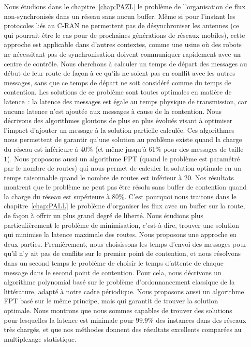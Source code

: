 Nous étudions dans le chapitre~\ref{chap:PAZL} le problème de l'organisation de flux non-synchronisés dans un réseau sans aucun buffer.
Même si pour l'instant les protocoles liés au C-RAN ne permettent pas de désynchroniser les antennes (ce qui pourrait être le cas pour de prochaines générations de réseaux mobiles), cette approche est applicable dans d'autres contextes, comme une usine où des robots ne nécessitant pas de synchronisation doivent communiquer rapidement avec un centre de contrôle.
Nous cherchons à calculer un temps de départ des messages au début de leur route de façon à ce qu'ils ne soient pas en conflit avec les autres messages, sans que ce temps de départ ne soit considéré comme du temps de contention.
Les solutions de ce problème sont toutes optimales en matière de latence : la latence des messages est égale au temps physique de transmission, car aucune latence n'est ajoutée aux messages à cause de la contention. Nous décrivons des algorithmes gloutons de plus en plus évolués visant à optimiser l'impact d'ajouter un message à la solution partielle calculée. Ces algorithmes nous permettent de garantir qu'une solution au problème existe quand la charge du réseau est inférieure à $40\%$ (et même jusqu'à $61\%$ pour des messages de taille $1$). Nous proposons aussi un algorithme FPT (quand le problème est paramétré par le nombre de routes) qui nous permet de calculer la solution optimale en un temps raisonnable quand le nombre de routes est inférieur à $20$. Nos résultats montrent que le problème ne peut pas être résolu sans buffer de contention quand la charge du réseau est supérieure à $80\%$.
C'est pourquoi nous traitons dans le chapitre~\ref{chap:PALL} le problème d'organiser les flux avec un buffer sur la route, de façon à offrir un plus grand degré de liberté. Nous étudions plus particulièrement le problème de minimisation, c'est-à-dire, trouver une solution qui minimise la latence maximale des routes. Nous proposons une approche en deux parties. Premièrement, nous choisissons les temps d'envoi des messages pour qu'il n'y ait pas de conflits sur le premier point de contention, et nous résolvons dans un second temps le problème de choisir le temps d'attente de chaque message dans le second point de contention. Pour cela, nous décrivons un algorithme polynomial basé sur le problème d'ordonnancement classique de la littérature, adapté à notre cadre périodique. Nous proposons aussi un algorithme FPT basé sur le même principe, mais qui garantit de trouver la solution optimale. Nous montrons que nous sommes capables de trouver des solutions pour lesquelles la latence est minimale pour $99.9\%$ des instances dans des réseaux très chargés, et que nos méthodes donnent des résultats excellents comparées au multiplexage statistique.

